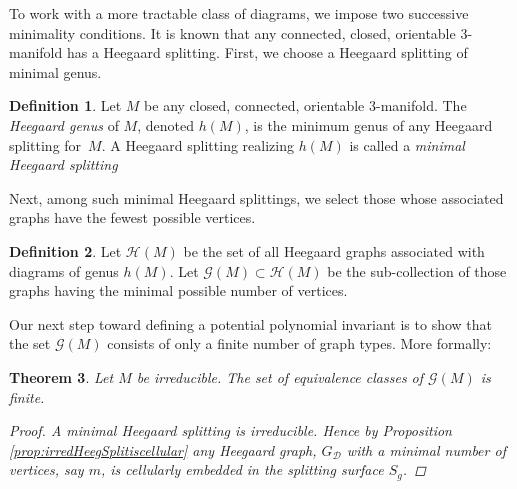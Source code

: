 \documentclass[pdflatex,sn-mathphys-num]{sn-jnl}%
\theoremstyle{plain}
\newtheorem{theorem}{Theorem}
\theoremstyle{definition}
\newtheorem{definition}[theorem]{Definition}
\theoremstyle{remark}
\begin{document}
To work with a more tractable class of diagrams, we impose two successive minimality conditions. It is known that any connected, closed, orientable $3$-manifold has a Heegaard splitting. First, we choose a Heegaard splitting of minimal genus.  

\begin{definition}
Let $M$ be any closed, connected, orientable $3$-manifold. The \emph{Heegaard genus} of $M$, denoted $h(M)$, is the minimum genus of any Heegaard splitting for~$M$. A Heegaard splitting realizing $h(M)$ is called a \emph{minimal Heegaard splitting}
\end{definition}

Next, among such minimal Heegaard splittings, we select those whose associated graphs have the fewest possible vertices.

\begin{definition}
Let $\mathcal{H}(M)$ be the set of all Heegaard graphs associated with diagrams of genus $h(M)$. Let $\mathcal{G}(M) \subset \mathcal{H}(M)$ be the sub-collection of those graphs having the minimal possible number of vertices.
\end{definition}

Our next step toward defining a potential polynomial invariant is to show that the set $\mathcal{G}(M)$ consists of only a finite number of graph types. More formally:

\begin{theorem}\label{finiteness} Let $M$ be irreducible. The set of equivalence classes of $\mathcal{G}(M)$ is finite.
\begin{proof}

A minimal Heegaard splitting is irreducible. Hence by Proposition \ref{prop:irredHeegSplitiscellular} any Heegaard graph, $G_\mathcal{D}$ with a minimal number of vertices, say $m$, is cellularly embedded in the splitting surface $S_g$.
\end{proof}
\end{theorem}
\end{document}
